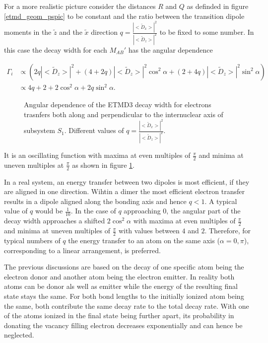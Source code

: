 For a more realistic picture
consider the distances $R$ and $Q$ as definded in figure \ref{etmd_geom_pspic}
to be constant and the ratio between the transition dipole moments
in the $\tilde{z}$ and the $\tilde{x}$ direction
$q=\frac{|<\tilde{D}_x>|^2}{|<\tilde{D}_z>|^2}$ to be fixed to some number.
In this case the decay width for each $M_{AB}'$ has the angular dependence

\begin{align}
 \Gamma_i &\propto \left( 2q |<\tilde{D}_{z}>|^2 +
                  (4+2q)|<\tilde{D}_{z}>|^2 \cos^2\alpha +
                  (2+4q)|<\tilde{D}_{z}>|^2 \sin^2\alpha \right) \\
          &\propto 4q + 2 + 2 \cos^2\alpha + 2q \sin^2\alpha .
\end{align}

\begin{figure}[h]
 \centering
 
 \caption{Angular dependence of the \ac{ETMD}3 decay width for electrons trasnfers
          both along and perpendicular to the internuclear axis of subsystem $S_1$.
          Different values of $q=\frac{|<\tilde{D}_x>|^2}{|<\tilde{D}_z>|^2}$.}
 \label{figure:etmd_angle}
\end{figure}



It is an oscillating function with maxima at even multiples of $\frac \pi 2$
and minima at uneven multiples at $\frac \pi 2$ as shown in figure
\ref{figure:etmd_angle}.


In a real system, an energy transfer between
two dipoles is most efficient, if they are aligned in one direction.
Wihtin a dimer the most efficient electron transfer results in a
dipole aligned along the bonding axis and hence $q<1$. A typical
value of $q$ would be $\frac 1{10}$. In the 
case of $q$ approaching 0, the angular part of
the decay width
approaches a shifted $2\cos^2 \alpha$ with maxima at even multiples of $\frac \pi2$
and minima at uneven multiples of $\frac \pi2$ with values between
$4$ and $2$.
Therefore, for typical numbers of $q$ the energy transfer
to an atom on the same axis ($\alpha = 0,\pi$), corresponding
to a linear arrangement, is preferred.

The previous discussions are based on the decay of one specific atom
being the electron donor and another atom being the electron emitter.
In reality both atoms can be donor als well as emitter while the energy
of the resulting final state stays the same. For both bond lengths to the
initially ionized atom being the same, both contribute the same decay rate
to the total decay rate. With one of the atoms ionized in the final state
being further apart, its probability in donating the vacancy filling electron
decreases exponentially and can hence be neglected.

